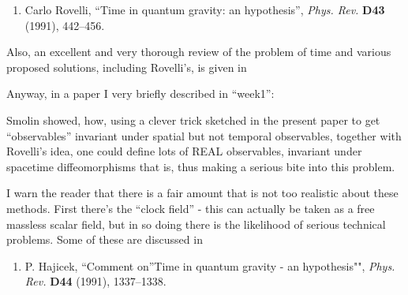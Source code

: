 \documentclass{article}
\def\tightlist{}
\renewcommand{\texttt}[1]{%
  \begingroup
  \ttfamily
  \begingroup\lccode`~=`/\lowercase{\endgroup\def~}{/\discretionary{}{}{}}%
  \begingroup\lccode`~=`[\lowercase{\endgroup\def~}{[\discretionary{}{}{}}%
  \begingroup\lccode`~=`.\lowercase{\endgroup\def~}{.\discretionary{}{}{}}%
  \catcode`/=\active\catcode`[=\active\catcode`.=\active
  \scantokens{#1\noexpand}%
  \endgroup
}
\begin{document}
\begin{enumerate}
\def\labelenumi{\arabic{enumi})}
\setcounter{enumi}{2}
\tightlist
\item
  Carlo Rovelli, ``Time in quantum gravity: an hypothesis'', \emph{Phys.
  Rev.} \textbf{D43} (1991), 442--456.
\end{enumerate}

Also, an excellent and very thorough review of the problem of time and
various proposed solutions, including Rovelli's, is given in


Anyway, in a paper I very briefly described in ``week1'':


Smolin showed, how, using a clever trick sketched in the present paper
to get ``observables'' invariant under spatial but not temporal
observables, together with Rovelli's idea, one could define lots of REAL
observables, invariant under spacetime diffeomorphisms that is, thus
making a serious bite into this problem.

I warn the reader that there is a fair amount that is not too realistic
about these methods. First there's the ``clock field'' - this can
actually be taken as a free massless scalar field, but in so doing there
is the likelihood of serious technical problems. Some of these are
discussed in

\begin{enumerate}
\def\labelenumi{\arabic{enumi})}
\setcounter{enumi}{5}
\tightlist
\item
  P. Hajicek, ``Comment on''Time in quantum gravity - an hypothesis"",
  \emph{Phys. Rev.} \textbf{D44} (1991), 1337--1338.
\end{enumerate}
\end{document}
